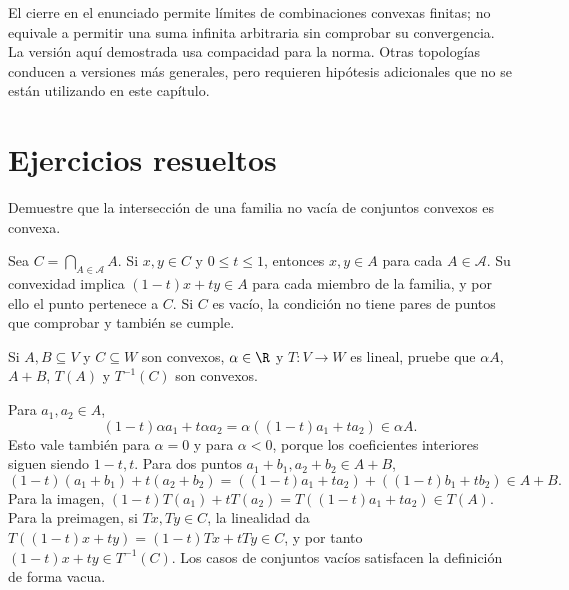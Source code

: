 El cierre en el enunciado permite límites de combinaciones convexas finitas; no equivale a permitir una suma infinita arbitraria sin comprobar su convergencia. La versión aquí demostrada usa compacidad para la norma. Otras topologías conducen a versiones más generales, pero requieren hipótesis adicionales que no se están utilizando en este capítulo.

\section{Ejercicios resueltos}

\begin{ejercicio}
Demuestre que la intersección de una familia no vacía de conjuntos convexos es convexa.
\end{ejercicio}
\begin{solucion}
Sea $C=\bigcap_{A\in\mathcal A}A$. Si $x,y\in C$ y $0\leq t\leq1$, entonces $x,y\in A$ para cada $A\in\mathcal A$. Su convexidad implica $(1-t)x+ty\in A$ para cada miembro de la familia, y por ello el punto pertenece a $C$. Si $C$ es vacío, la condición no tiene pares de puntos que comprobar y también se cumple.
\end{solucion}

\begin{ejercicio}
Si $A,B\subseteq V$ y $C\subseteq W$ son convexos, $\alpha\in\R$ y $T:V\to W$ es lineal, pruebe que $\alpha A$, $A+B$, $T(A)$ y $T^{-1}(C)$ son convexos.
\end{ejercicio}
\begin{solucion}
Para $a_1,a_2\in A$,
\[
 (1-t)\alpha a_1+t\alpha a_2=\alpha((1-t)a_1+ta_2)\in\alpha A.
\]
Esto vale también para $\alpha=0$ y para $\alpha<0$, porque los coeficientes interiores siguen siendo $1-t,t$. Para dos puntos $a_1+b_1,a_2+b_2\in A+B$,
\[
 (1-t)(a_1+b_1)+t(a_2+b_2)
 =((1-t)a_1+ta_2)+((1-t)b_1+tb_2)\in A+B.
\]
Para la imagen, $(1-t)T(a_1)+tT(a_2)=T((1-t)a_1+ta_2)\in T(A)$. Para la preimagen, si $Tx,Ty\in C$, la linealidad da $T((1-t)x+ty)=(1-t)Tx+tTy\in C$, y por tanto $(1-t)x+ty\in T^{-1}(C)$. Los casos de conjuntos vacíos satisfacen la definición de forma vacua.
\end{solucion}

